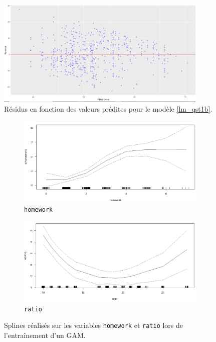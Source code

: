 \documentclass{article}
\begin{document}
\begin{figure}[H]  %
	\centering
\includegraphics[width=0.9\textwidth]{graphiques/residus_VS_predicitions_lm_Qst1b}
\caption{Résidus en fonction des valeurs prédites pour le modèle \eqref{lm_qst1b}.}
\label{residus_VS_predicitions_lm_Qst1b}
\end{figure}

\begin{figure}[H]  %
	\centering
	\begin{subfigure}{0.48\textwidth}
		\includegraphics[width=1\textwidth]{graphiques/Spline_Homework}
		\caption{\texttt{homework}}
		\label{Spline_Homework}
	\end{subfigure}
	\begin{subfigure}{0.48\textwidth}
		\includegraphics[width=1\textwidth]{graphiques/Spline_Ratio}
		\caption{\texttt{ratio}}
		\label{Spline_Ratio}
	\end{subfigure}
	\caption{Splines réalisés sur les variables \texttt{homework} et \texttt{ratio} lors de l'entraînement d'un GAM.}
	\label{Spline_lm1}
\end{figure}
\end{document}
